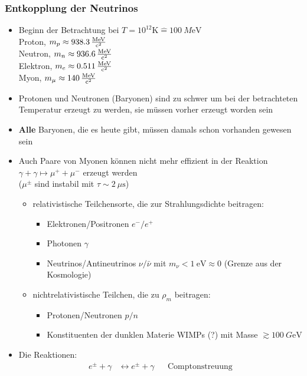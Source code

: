 \subsubsection{Entkopplung der Neutrinos}
\begin{itemize}
	\item Beginn der Betrachtung bei $T=10^{12}\si{\K}\hat{=}\SI{100}{M\eV}$\\
		Proton, $m_p\approx\SI{938.3}{\frac{M\eV}{c^2}}$\\
		Neutron, $m_n\approx\SI{936.6}{\frac{M\eV}{c^2}}$\\
		Elektron, $m_e\approx\SI{0.511}{\frac{M\eV}{c^2}}$\\
		Myon, $m_\mu\approx\SI{140}{\frac{M\eV}{c^2}}$
	\item Protonen und Neutronen (Baryonen) sind zu schwer um bei der betrachteten Temperatur erzeugt zu werden, sie müssen vorher erzeugt worden sein
	\item \textbf{Alle} Baryonen, die es heute gibt, müssen damals schon vorhanden gewesen sein
	\item Auch Paare von Myonen können nicht mehr effizient in der Reaktion $\gamma +\gamma \mapsto \mu^++\mu^-$ erzeugt werden\\
		($\mu^\pm$ sind instabil mit $\tau\sim\SI{2}{\mu\s}$)
		\begin{itemize}
			\item relativistische Teilchensorte, die zur Strahlungsdichte beitragen:
				\begin{itemize}[label={$\cdot$}]
					\item Elektronen/Positronen $e^-/e^+$
					\item Photonen $\gamma$
					\item Neutrinos/Antineutrinos $\nu/\bar{\nu}$ mit $m_\nu<\SI{1}{\eV}\approx 0$ (Grenze aus der Kosmologie)
				\end{itemize}
			\item nichtrelativistische Teilchen, die zu $\rho_m$ beitragen:
				\begin{itemize}[label={$\cdot$}]
					\item Protonen/Neutronen $p/n$
					\item Konstituenten der dunklen Materie WIMPs (?) mit Masse $\gtrsim\SI{100}{G\eV}$
				\end{itemize}
		\end{itemize}
	\item Die Reaktionen:
		\begin{align*}
			e^\pm+\gamma&\leftrightarrow e^\pm+\gamma & &\text{Comptonstreuung}\\

\end{align*}
\end{itemize}
